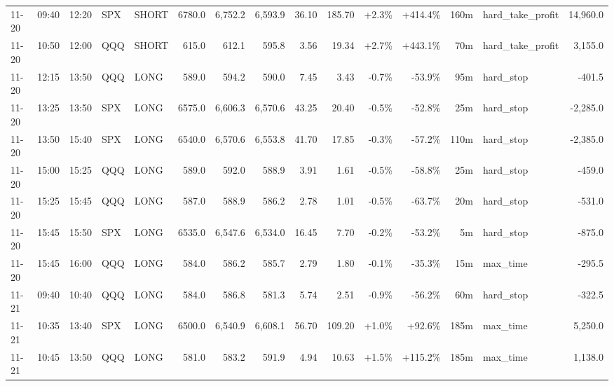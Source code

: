 \documentclass[11pt,a4paper,twoside]{article}
\begin{document}
\begin{landscape}
\begin{center}
\begin{longtable}{>{\color{txtmain}}l l l l l r r r r r r r r >{\color{txtmain}}l r}
11-20 & 09:40 & 12:20 & SPX & SHORT & 6780.0 & 6,752.2 & 6,593.9 & 36.10 & 185.70 & \textcolor{wingreen}{+2.3\%} & \textcolor{wingreen}{+414.4\%} & 160m & hard\_take\_profit & \textcolor{wingreen}{14,960.0} \\
11-20 & 10:50 & 12:00 & QQQ & SHORT & 615.0 & 612.1 & 595.8 & 3.56 & 19.34 & \textcolor{wingreen}{+2.7\%} & \textcolor{wingreen}{+443.1\%} & 70m & hard\_take\_profit & \textcolor{wingreen}{3,155.0} \\
11-20 & 12:15 & 13:50 & QQQ & LONG & 589.0 & 594.2 & 590.0 & 7.45 & 3.43 & \textcolor{lossred}{-0.7\%} & \textcolor{lossred}{-53.9\%} & 95m & hard\_stop & \textcolor{lossred}{-401.5} \\
11-20 & 13:25 & 13:50 & SPX & LONG & 6575.0 & 6,606.3 & 6,570.6 & 43.25 & 20.40 & \textcolor{lossred}{-0.5\%} & \textcolor{lossred}{-52.8\%} & 25m & hard\_stop & \textcolor{lossred}{-2,285.0} \\
11-20 & 13:50 & 15:40 & SPX & LONG & 6540.0 & 6,570.6 & 6,553.8 & 41.70 & 17.85 & \textcolor{lossred}{-0.3\%} & \textcolor{lossred}{-57.2\%} & 110m & hard\_stop & \textcolor{lossred}{-2,385.0} \\
11-20 & 15:00 & 15:25 & QQQ & LONG & 589.0 & 592.0 & 588.9 & 3.91 & 1.61 & \textcolor{lossred}{-0.5\%} & \textcolor{lossred}{-58.8\%} & 25m & hard\_stop & \textcolor{lossred}{-459.0} \\
11-20 & 15:25 & 15:45 & QQQ & LONG & 587.0 & 588.9 & 586.2 & 2.78 & 1.01 & \textcolor{lossred}{-0.5\%} & \textcolor{lossred}{-63.7\%} & 20m & hard\_stop & \textcolor{lossred}{-531.0} \\
11-20 & 15:45 & 15:50 & SPX & LONG & 6535.0 & 6,547.6 & 6,534.0 & 16.45 & 7.70 & \textcolor{lossred}{-0.2\%} & \textcolor{lossred}{-53.2\%} & 5m & hard\_stop & \textcolor{lossred}{-875.0} \\
11-20 & 15:45 & 16:00 & QQQ & LONG & 584.0 & 586.2 & 585.7 & 2.79 & 1.80 & \textcolor{lossred}{-0.1\%} & \textcolor{lossred}{-35.3\%} & 15m & max\_time & \textcolor{lossred}{-295.5} \\
11-21 & 09:40 & 10:40 & QQQ & LONG & 584.0 & 586.8 & 581.3 & 5.74 & 2.51 & \textcolor{lossred}{-0.9\%} & \textcolor{lossred}{-56.2\%} & 60m & hard\_stop & \textcolor{lossred}{-322.5} \\
11-21 & 10:35 & 13:40 & SPX & LONG & 6500.0 & 6,540.9 & 6,608.1 & 56.70 & 109.20 & \textcolor{wingreen}{+1.0\%} & \textcolor{wingreen}{+92.6\%} & 185m & max\_time & \textcolor{wingreen}{5,250.0} \\
11-21 & 10:45 & 13:50 & QQQ & LONG & 581.0 & 583.2 & 591.9 & 4.94 & 10.63 & \textcolor{wingreen}{+1.5\%} & \textcolor{wingreen}{+115.2\%} & 185m & max\_time & \textcolor{wingreen}{1,138.0} \\

\end{longtable}
\end{center}
\end{landscape}
\end{document}
